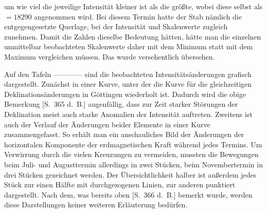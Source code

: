 um wie viel die jeweilige Intensität kleiner ist als die größte, wobei diese selbst als $=18290$ angenommen wird. Bei diesem Termin hatte der Stab nämlich die entgegengesetzte Querlage, bei der Intensität und Skalenwerte zugleich zunehmen. Damit die Zahlen dieselbe Bedeutung hätten, hätte man die einzelnen unmittelbar beobachteten Skalenwerte daher mit dem Minimum statt mit dem Maximum vergleichen müssen. Das wurde versehentlich übersehen.

Auf den Tafeln ---\quad---\quad---\quad--- sind die beobachteten Intensitätsänderungen grafisch dargestellt. Zunächst in einer Kurve, unter der die Kurve für die gleichzeitigen Deklinationsänderungen in Göttingen wiederholt ist. Dadurch wird die obige Bemerkung [S.\ 365 d.\ B.] augenfällig, dass zur Zeit starker Störungen der Deklination meist auch starke Anomalien der Intensität auftreten. Zweitens ist auch der Verlauf der Änderungen beider Elemente in einer Kurve zusammengefasst. So erhält man ein anschauliches Bild der Änderungen der horizontalen Komponente der erdmagnetischen Kraft während jedes Termins. Um Verwirrung durch die vielen Kreuzungen zu vermeiden, mussten die Bewegungen beim Juli- und Augusttermin allerdings in zwei Stücken, beim Novembertermin in drei Stücken gezeichnet werden. Der Übersichtlichkeit halber ist außerdem jedes Stück zur einen Hälfte mit durchgezogenen Linien, zur anderen punktiert dargestellt. Nach dem, was bereits oben [S.\ 366 d.\ B.] bemerkt wurde, werden diese Darstellungen keiner weiteren Erläuterung bedürfen.

